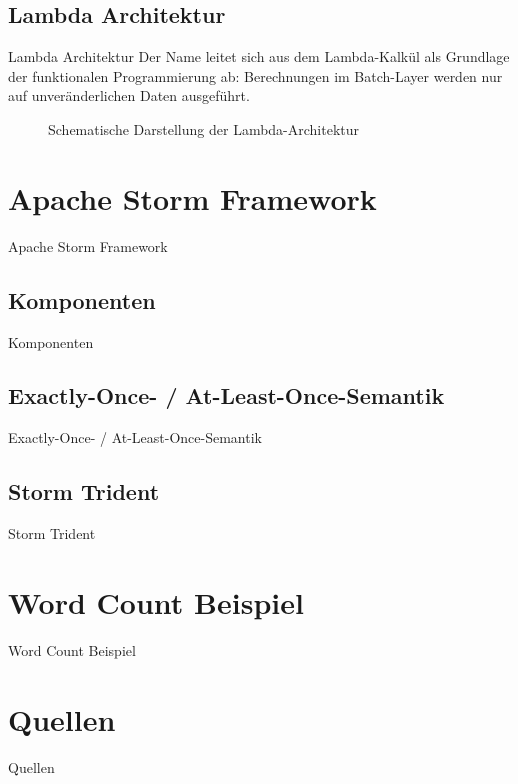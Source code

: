 \documentclass{beamer}
\begin{document}
\subsection{Lambda Architektur}
\begin{frame}[t]{Lambda Architektur}
  Der Name leitet sich aus dem Lambda-Kalkül als Grundlage der
  funktionalen Programmierung ab: Berechnungen im Batch-Layer werden
  nur auf unveränderlichen Daten ausgeführt.
\begin{figure}[h]
	\center
	\scalebox{.4}{}
	\caption{Schematische Darstellung der Lambda-Architektur}
	\label{fig:lambdaarch}
\end{figure}
\end{frame}

\section{Apache Storm Framework}
\begin{frame}[t]{Apache Storm Framework}
\end{frame}

\subsection{Komponenten}
\begin{frame}[t]{Komponenten}
\end{frame}

\subsection{Exactly-Once- / At-Least-Once-Semantik}
\begin{frame}[t]{Exactly-Once- / At-Least-Once-Semantik}
\end{frame}

\subsection{Storm Trident}
\begin{frame}[t]{Storm Trident}
\end{frame}

\section{Word Count Beispiel}
\begin{frame}[t]{Word Count Beispiel}
\end{frame}

\section{Quellen}
\begin{frame}[t]{Quellen}
\end{frame}
\end{document}
